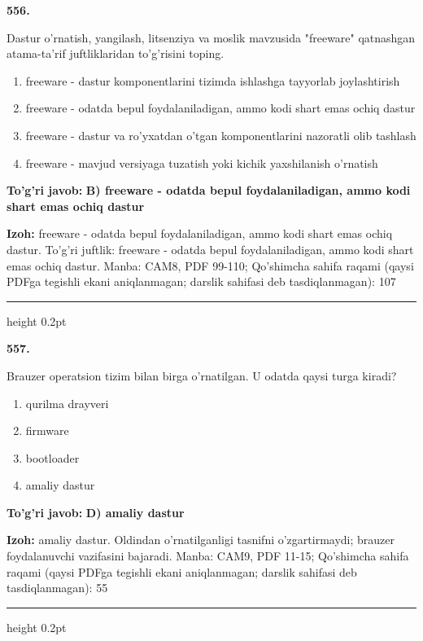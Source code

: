 \documentclass[10pt,a4paper]{article}
\begin{document}
{\bfseries\sffamily\color{ink} 556.}
\par
Dastur o'rnatish, yangilash, litsenziya va moslik mavzusida "freeware" qatnashgan atama-ta'rif juftliklaridan to'g'risini toping.
\begin{enumerate}[label=\Alph*),leftmargin=9mm]
\item freeware - dastur komponentlarini tizimda ishlashga tayyorlab joylashtirish
\item freeware - odatda bepul foydalaniladigan, ammo kodi shart emas ochiq dastur
\item freeware - dastur va ro'yxatdan o'tgan komponentlarini nazoratli olib tashlash
\item freeware - mavjud versiyaga tuzatish yoki kichik yaxshilanish o'rnatish
\end{enumerate}
\begin{tcolorbox}[enhanced,breakable,colback=teal!4,colframe=teal!60!black,boxrule=0.45pt,arc=1.2mm,left=2.7mm,right=2.7mm,top=1.8mm,bottom=1.8mm,before skip=2mm,after skip=2mm]
{\bfseries\sffamily\color{teal}To'g'ri javob:} \textbf{B) freeware - odatda bepul foydalaniladigan, ammo kodi shart emas ochiq dastur}
\par\smallskip
{\bfseries Izoh:} freeware - odatda bepul foydalaniladigan, ammo kodi shart emas ochiq dastur. To'g'ri juftlik: freeware - odatda bepul foydalaniladigan, ammo kodi shart emas ochiq dastur. Manba: CAM8, PDF 99-110; Qo'shimcha sahifa raqami (qaysi PDFga tegishli ekani aniqlanmagan; darslik sahifasi deb tasdiqlanmagan): 107
\end{tcolorbox}
\vspace{2mm}\hrule height 0.2pt\vspace{3mm}

{\bfseries\sffamily\color{ink} 557.}
\par
Brauzer operatsion tizim bilan birga o'rnatilgan. U odatda qaysi turga kiradi?
\begin{enumerate}[label=\Alph*),leftmargin=9mm]
\item qurilma drayveri
\item firmware
\item bootloader
\item amaliy dastur
\end{enumerate}
\begin{tcolorbox}[enhanced,breakable,colback=teal!4,colframe=teal!60!black,boxrule=0.45pt,arc=1.2mm,left=2.7mm,right=2.7mm,top=1.8mm,bottom=1.8mm,before skip=2mm,after skip=2mm]
{\bfseries\sffamily\color{teal}To'g'ri javob:} \textbf{D) amaliy dastur}
\par\smallskip
{\bfseries Izoh:} amaliy dastur. Oldindan o'rnatilganligi tasnifni o'zgartirmaydi; brauzer foydalanuvchi vazifasini bajaradi. Manba: CAM9, PDF 11-15; Qo'shimcha sahifa raqami (qaysi PDFga tegishli ekani aniqlanmagan; darslik sahifasi deb tasdiqlanmagan): 55
\end{tcolorbox}
\vspace{2mm}\hrule height 0.2pt\vspace{3mm}
\end{document}
